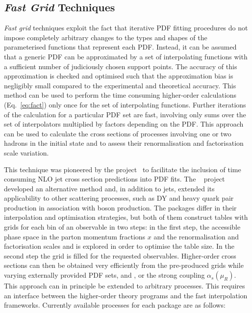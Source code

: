\subsection{\emph{Fast Grid} Techniques}

  \emph{Fast grid} techniques exploit the fact that iterative PDF fitting
  procedures do not impose completely arbitrary changes to the types
  and shapes of the parameterised functions that represent each PDF\@.
  Instead, it can be assumed that a generic PDF can be approximated by
  a set of interpolating functions with a sufficient number of
 judiciously chosen support points. The 
  accuracy of this approximation is checked and optimised 
 such that the approximation bias is negligibly
  small compared to the experimental and theoretical accuracy. 
   This method can be used to perform
  the time consuming higher-order calculations (Eq.~\ref{eq:fact})
  only once for the set of interpolating functions. 
  Further iterations of the calculation for
  a particular PDF set are fast, involving only sums over
  the set of interpolators multiplied by factors depending on the
  PDF\@. This approach can be used to calculate the cross sections 
  of processes involving one or two hadrons in the initial state and to
  assess their renormalisation and factorisation scale variation.

  This technique was pioneered by the \fastnlo
  project~\cite{Kluge:2006xs} to facilitate the inclusion of
   time consuming NLO jet cross section predictions into PDF fits.
  The \applgrid~\cite{Carli:2010rw} project developed an alternative method
  and, in addition to jets, extended its applicability to other scattering processes, 
  such as DY and heavy quark pair production in association with boson production.
  The packages differ in their interpolation
  and optimisation strategies, but both of them construct tables with
  grids for each bin of an observable in two steps: in the first step,
  the accessible phase space in the parton momentum fractions $x$ and
  the renormalisation and factorisation scales \mur and \muf is
  explored in order to optimise the table size. In the second step
  the grid is filled for the
  requested observables. Higher-order cross sections can then be
  obtained very efficiently from the pre-produced grids while varying
  externally provided PDF sets, \mur and \muf, or the strong coupling
  $\alpha_s(\mu_R)$. This approach can in principle be extended to arbitrary
  processes. This requires an interface between the
  higher-order theory programs and the fast interpolation
  frameworks. Currently available processes for each package are as follows:

